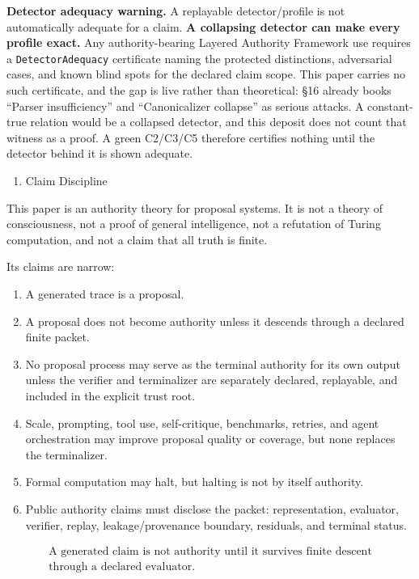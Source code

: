 \documentclass[
  10pt,
]{article}
\providecommand{\tightlist}{%
  \setlength{\itemsep}{0pt}\setlength{\parskip}{0pt}}
\providecommand{\tightlist}{%
  \setlength{\itemsep}{0pt}\setlength{\parskip}{0pt}}
\DeclareRobustCommand{\texttt}[1]{{\paperSymbolFont\nolinkurl{#1}}}
\begin{document}
\textbf{Detector adequacy warning.} A replayable detector/profile is not automatically adequate for a claim. \textbf{A collapsing detector can make every profile exact.} Any authority-bearing Layered Authority Framework use requires a \texttt{DetectorAdequacy} certificate naming the protected distinctions, adversarial cases, and known blind spots for the declared claim scope. This paper carries no such certificate, and the gap is live rather than theoretical: §16 already books ``Parser insufficiency'' and ``Canonicalizer collapse'' as serious attacks. A constant-true relation would be a collapsed detector, and this deposit does not count that witness as a proof. A green C2/C3/C5 therefore certifies nothing until the detector behind it is shown adequate.

\begin{enumerate}
\def\labelenumi{\arabic{enumi}.}
\tightlist
\item
  Claim Discipline
\end{enumerate}

This paper is an authority theory for proposal systems. It is not a theory of consciousness, not a proof of general intelligence, not a refutation of Turing computation, and not a claim that all truth is finite.

Its claims are narrow:

\begin{enumerate}
\def\labelenumi{\arabic{enumi}.}
\tightlist
\item
  A generated trace is a proposal.
\item
  A proposal does not become authority unless it descends through a declared finite packet.
\item
  No proposal process may serve as the terminal authority for its own output unless the verifier and terminalizer are separately declared, replayable, and included in the explicit trust root.
\item
  Scale, prompting, tool use, self-critique, benchmarks, retries, and agent orchestration may improve proposal quality or coverage, but none replaces the terminalizer.
\item
  Formal computation may halt, but halting is not by itself authority.
\item
  Public authority claims must disclose the packet: representation, evaluator, verifier, replay, leakage/provenance boundary, residuals, and terminal status.
\end{enumerate}

\protect\hypertarget{math-E0015-0021}{}{\[
\boxed{
\begin{gathered}\text{A generated claim is not authority until it survives finite descent}\\
\text{through a declared evaluator.}\end{gathered}
}
\]}
\end{document}
